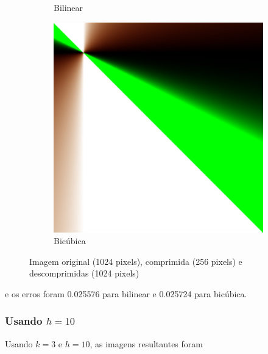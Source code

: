 \documentclass{article}
\begin{document}
\begin{figure}[ht]
\begin{subfigure}{0.23\textwidth}
    \caption{Bilinear}
  \end{subfigure}%
  \hfill
  \begin{subfigure}{0.23\textwidth}
    \centering
    \includegraphics[width=\textwidth]{polinomial/h-1/decompressed-bicubica.png}
    \caption{Bicúbica}
  \end{subfigure}
  \caption{Imagem original (1024 pixels), comprimida (256 pixels) e descomprimidas (1024 pixels)}
\end{figure}

\newpage

e os erros foram 0.025576 para bilinear e 0.025724 para bicúbica.

\subsubsection[Usando h=10]{Usando $h=10$}

Usando $k=3$ e $h=10$, as imagens resultantes foram
\end{document}
